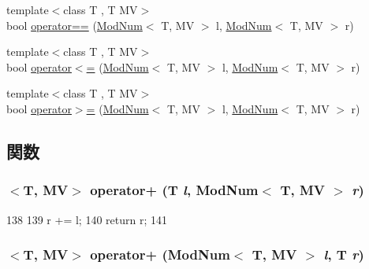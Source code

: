 \begin{DoxyCompactItemize}
{\footnotesize template$<$class T , T MV$>$ }\\bool \hyperlink{mod__num_8hh_ad75509a921857057cd6fbaf84c699b48}{operator==} (\hyperlink{classModNum}{ModNum}$<$ T, MV $>$ l, \hyperlink{classModNum}{ModNum}$<$ T, MV $>$ r)
\item 
{\footnotesize template$<$class T , T MV$>$ }\\bool \hyperlink{mod__num_8hh_a6eb41d5269e96df1206fe6a2eab3e656}{operator$<$=} (\hyperlink{classModNum}{ModNum}$<$ T, MV $>$ l, \hyperlink{classModNum}{ModNum}$<$ T, MV $>$ r)
\item 
{\footnotesize template$<$class T , T MV$>$ }\\bool \hyperlink{mod__num_8hh_aaa8d528ed5d144f66b188d80feef0c09}{operator$>$=} (\hyperlink{classModNum}{ModNum}$<$ T, MV $>$ l, \hyperlink{classModNum}{ModNum}$<$ T, MV $>$ r)
\end{DoxyCompactItemize}


\subsection{関数}
\hypertarget{mod__num_8hh_af9edd9c0f5eb44a3e1e19c7a7dec606e}{
\subsubsection[{operator+}]{$<$T, MV$>$ operator+ (T {\em l}, \/  {\bf ModNum}$<$ T, MV $>$ {\em r})}}
\label{mod__num_8hh_af9edd9c0f5eb44a3e1e19c7a7dec606e}



\begin{DoxyCode}
138                                 {
139     r += l;
140     return r;
141 }
\end{DoxyCode}
\hypertarget{mod__num_8hh_aaf99447ed554e609c6fc4dc36d138df0}{
\subsubsection[{operator+}]{$<$T, MV$>$ operator+ ({\bf ModNum}$<$ T, MV $>$ {\em l}, \/  T {\em r})}}
\label{mod__num_8hh_aaf99447ed554e609c6fc4dc36d138df0}



